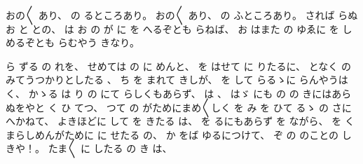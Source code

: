 
おの〳〵
あり、
%
の
るところあり。
%
おの〳〵
あり、
%
の
ふところあり。
%
されば
らぬ
お
と
との、
%
は
お
の
が
に
を
へるぞとも
らねば、
%
お
はまた
の
ゆゑに
を
しめるぞとも
らむやう
きなり。

ら
ずる
の
れを、
%
せめては
の
に
めんと、
%
を
はせて
に
りたるに、
%
となく
の
みてうつかりとしたる
、
%
ち
を
まれて
きしが、
%
を
して
らるゝに
らんやうは
く、
%
かゝる
は
り
の
にて
らしくもあらず、
%
は
、
%
はゞ
にも
の%
の
きにはあらぬをやと
く
ひ
てつ、
%
つて
の
がためにまめ〳〵しく
を
み
を
ひて
るゝ
の
さに
へかねて、
%
よきほどに
して
を
きたる
は、
%
を
るにもあらず
を
ながら、
%
を
く
まらしめんがために
に
せたる
の、
%
か
をば
ゆるにつけて、
%
ぞ
の
のことの
しきや！。
%
たま〳〵
に
したる
の
き
は、
